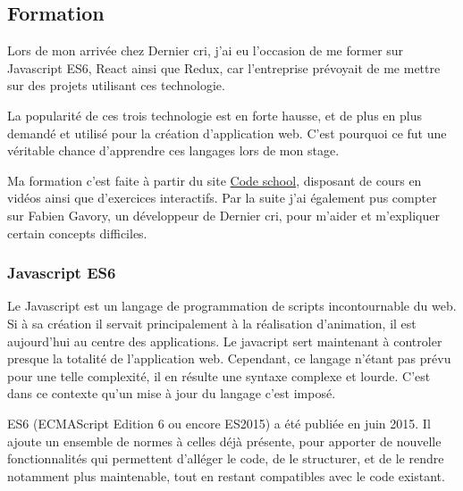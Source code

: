\documentclass[12pt,a4paper]{article}
\begin{document}
  \subsection{Formation}\label{formation}

  \bigskip

  Lors de mon arrivée chez Dernier cri, j'ai eu l'occasion de me former
  sur Javascript ES6, React ainsi que Redux, car l'entreprise prévoyait de
  me mettre sur des projets utilisant ces technologie.

  \bigskip

  La popularité de ces trois technologie est en forte hausse, et de plus
  en plus demandé et utilisé pour la création d'application web. C'est
  pourquoi ce fut une véritable chance d'apprendre ces langages lors de
  mon stage.

  \bigskip

  Ma formation c'est faite à partir du site
  \href{https://www.codeschool.com/}{Code school}, disposant de cours en
  vidéos ainsi que d'exercices interactifs. Par la suite j'ai également
  pus compter sur Fabien Gavory, un développeur de Dernier cri, pour
  m'aider et m'expliquer certain concepts difficiles.

  \bigskip

  \subsubsection{Javascript ES6}\label{javascript-es6}

  \bigskip

  Le Javascript est un langage de programmation de scripts incontournable
  du web. Si à sa création il servait principalement à la réalisation
  d'animation, il est aujourd'hui au centre des applications. Le javacript
  sert maintenant à controler presque la totalité de l'application web.
  Cependant, ce langage n'étant pas prévu pour une telle complexité, il en
  résulte une syntaxe complexe et lourde. C'est dans ce contexte qu'un
  mise à jour du langage c'est imposé.

  \bigskip

  ES6 (ECMAScript Edition 6 ou encore ES2015) a été publiée en juin 2015.
  Il ajoute un ensemble de normes à celles déjà présente, pour apporter de
  nouvelle fonctionnalités qui permettent d'alléger le code, de le
  structurer, et de le rendre notamment plus maintenable, tout en restant
  compatibles avec le code existant.

  \bigskip
\end{document}
